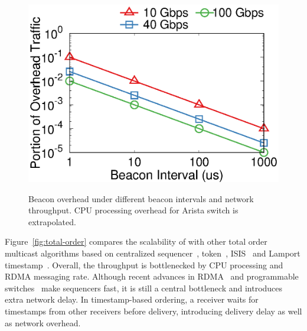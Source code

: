 \begin{figure}[t]
\begin{minipage}[t]{.32\textwidth}
		{\includegraphics[width=\textwidth]{gnuplot/beacon_network_overhead.eps}}
		\newline
		\caption{
			Beacon overhead under different beacon intervals and network throughput.
			CPU processing overhead for Arista switch is extrapolated.
		}
		\label{fig:overhead}
	\end{minipage}
\end{figure}

Figure~\ref{fig:total-order} compares the scalability of \sys with other total order multicast algorithms based on centralized sequencer~\cite{eris,kaminsky2016design}, token~\cite{rajagopalan1989token}, ISIS~\cite{birman1985replication} and Lamport timestamp~\cite{lamport1978time}.
Overall, the throughput is bottlenecked by CPU processing and RDMA messaging rate.
Although recent advances in RDMA~\cite{kaminsky2016design} and programmable switches~\cite{eris} make sequencers fast, it is still a central bottleneck and introduces extra network delay.
In timestamp-based ordering, a receiver waits for timestamps from  other receivers before delivery, introducing delivery delay as well as network overhead.


